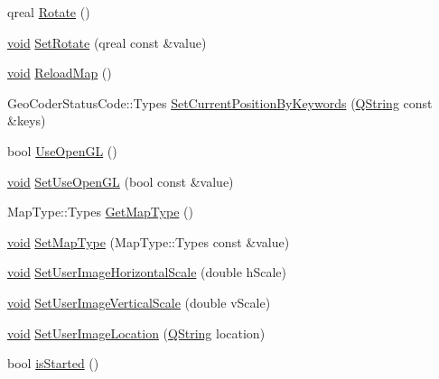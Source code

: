 \begin{DoxyCompactItemize}
\item 
qreal \hyperlink{group___o_p_map_widget_gaea05eeafa50a244b2356918c2dae0444}{\-Rotate} ()
\item 
\hyperlink{group___u_a_v_objects_plugin_ga444cf2ff3f0ecbe028adce838d373f5c}{void} \hyperlink{group___o_p_map_widget_ga1e6312bc140cbcfa38ac1bd66b278a71}{\-Set\-Rotate} (qreal const \&value)
\item 
\hyperlink{group___u_a_v_objects_plugin_ga444cf2ff3f0ecbe028adce838d373f5c}{void} \hyperlink{group___o_p_map_widget_ga5281e4aae5ac664f9d4093735e6ced51}{\-Reload\-Map} ()
\item 
\-Geo\-Coder\-Status\-Code\-::\-Types \hyperlink{group___o_p_map_widget_ga6dfd41d966be5940e4bb94dd36a25499}{\-Set\-Current\-Position\-By\-Keywords} (\hyperlink{group___u_a_v_objects_plugin_gab9d252f49c333c94a72f97ce3105a32d}{\-Q\-String} const \&keys)
\item 
bool \hyperlink{group___o_p_map_widget_gafe684fbd6e3d76b2dbb9eeb2ffeab969}{\-Use\-Open\-G\-L} ()
\item 
\hyperlink{group___u_a_v_objects_plugin_ga444cf2ff3f0ecbe028adce838d373f5c}{void} \hyperlink{group___o_p_map_widget_ga1dad00a9a3dc508690c7db4cb7b3373d}{\-Set\-Use\-Open\-G\-L} (bool const \&value)
\item 
\-Map\-Type\-::\-Types \hyperlink{group___o_p_map_widget_gaf5f079175bace819bcc168c5ea4bdb59}{\-Get\-Map\-Type} ()
\item 
\hyperlink{group___u_a_v_objects_plugin_ga444cf2ff3f0ecbe028adce838d373f5c}{void} \hyperlink{group___o_p_map_widget_ga57d623773f3801edb2a359b9d92c648b}{\-Set\-Map\-Type} (\-Map\-Type\-::\-Types const \&value)
\item 
\hyperlink{group___u_a_v_objects_plugin_ga444cf2ff3f0ecbe028adce838d373f5c}{void} \hyperlink{group___o_p_map_widget_gad61028ad754a5341e96c7f2e0e8c13f0}{\-Set\-User\-Image\-Horizontal\-Scale} (double h\-Scale)
\item 
\hyperlink{group___u_a_v_objects_plugin_ga444cf2ff3f0ecbe028adce838d373f5c}{void} \hyperlink{group___o_p_map_widget_gaac2d5997b77a7b661f1d983316e4f825}{\-Set\-User\-Image\-Vertical\-Scale} (double v\-Scale)
\item 
\hyperlink{group___u_a_v_objects_plugin_ga444cf2ff3f0ecbe028adce838d373f5c}{void} \hyperlink{group___o_p_map_widget_gab46d43fc65b333d32a79056ca882caa0}{\-Set\-User\-Image\-Location} (\hyperlink{group___u_a_v_objects_plugin_gab9d252f49c333c94a72f97ce3105a32d}{\-Q\-String} location)
\item 
bool \hyperlink{group___o_p_map_widget_ga1a79fb1b73da4c902626f6dcee9fa372}{is\-Started} ()

\end{DoxyCompactItemize}
